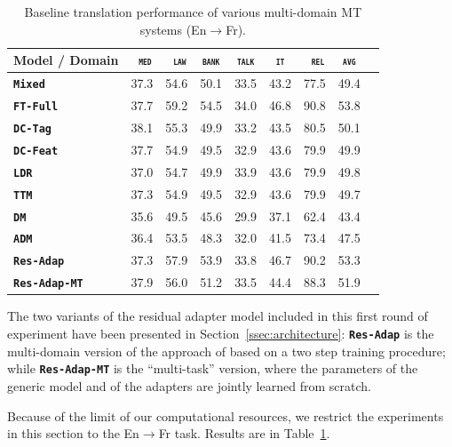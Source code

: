 \documentclass[11pt,a4paper]{article}
\newcommand{\fyFuture}[1]{\done[FY]\Todo[FY:]{\textcolor{red}{#1}}}
\newcommand{\domain}[1]{\texttt{\textsc{#1}}}
\newcommand{\system}[1]{\texttt{\textbf{#1}}}
\begin{document}
\begin{table}[t!]
  \centering
  \begin{tabular}{|p{3cm}|*{8}{r|}} \hline
    Model / Domain & \multicolumn{1}{c|}{\domain{ med}} & \multicolumn{1}{c|}{\domain{ law}} & \multicolumn{1}{c|}{\domain{bank}} & \multicolumn{1}{c|}{\domain{talk}} & \multicolumn{1}{c|}{\domain{ it }} & \multicolumn{1}{c|}{\domain{ rel}} & \multicolumn{1}{c|}{\domain{avg}} \\ \hline 
    \system{Mixed}        & 37.3 & 54.6 & 50.1 & 33.5 & 43.2 & 77.5  &  49.4 \\
    \system{FT-Full}       & 37.7 & 59.2 & 54.5 & 34.0 & 46.8 & 90.8 & 53.8 \\
    \hline 
    \system{DC-Tag}      & 38.1 & 55.3 & 49.9   & 33.2 & 43.5 & 80.5  & 50.1 \\
    \system{DC-Feat}     & 37.7 & 54.9 & 49.5   & 32.9 & 43.6 & 79.9 & 49.9  \\
    \system{LDR}            & 37.0  & 54.7 & 49.9 & 33.9 & 43.6 & 79.9 & 49.8    \\
    \system{TTM}           & 37.3  & 54.9 & 49.5 & 32.9 & 43.6 & 79.9 & 49.7   \\
    \system{DM}            & 35.6  & 49.5  & 45.6 & 29.9 & 37.1 & 62.4 & 43.4   \\ 
    \system{ADM}          & 36.4  & 53.5  & 48.3 & 32.0 & 41.5 & 73.4 & 47.5   \\
    \hline
    \system{Res-Adap}         & 37.3 & 57.9 & 53.9 & 33.8 & 46.7 & 90.2 & 53.3 \\ 
    \system{Res-Adap-MT}  & 37.9 & 56.0 & 51.2  & 33.5 & 44.4 & 88.3 & 51.9 \\
    \hline
  \end{tabular}
  \caption{Baseline translation performance of various multi-domain MT systems (En$\rightarrow$Fr).}
  \label{tab:performance-multi}
\end{table}
The two variants of the residual adapter model included in this first round of experiment have been presented in Section~\ref{ssec:architecture}: \system{Res-Adap} is the multi-domain version of the approach of \citet{Bapna19simple} based on a two step training procedure; while \system{Res-Adap-MT} is the ``multi-task'' version, where the parameters of the generic model and of the adapters are jointly learned from scratch.

Because of the limit of our computational resources, we restrict the experiments in this section to the En$\rightarrow$Fr task. Results are in Table~\ref{tab:performance-multi}.\fyFuture{Perform experiments for de:en}\fyFuture{Restore results where residual are removed from other paper.}
\end{document}
